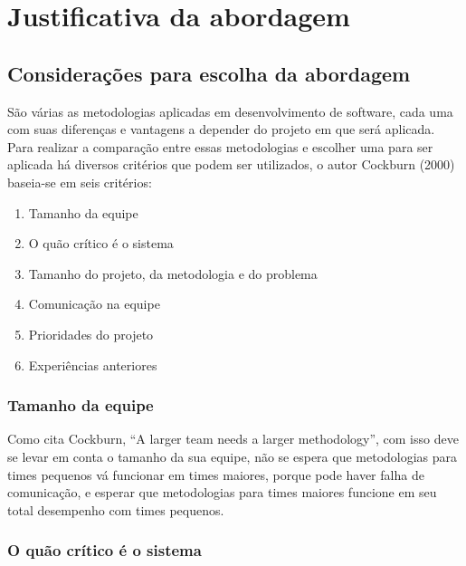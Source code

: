 \chapter{Justificativa da abordagem}

\section{Considerações para escolha da abordagem}

São várias as metodologias aplicadas em desenvolvimento de software, cada uma com suas diferenças e vantagens a depender do projeto em que será aplicada.
Para realizar a comparação entre essas metodologias e escolher uma para ser aplicada há diversos critérios que podem ser utilizados, o autor Cockburn (2000) baseia-se em seis critérios: 
\begin{enumerate}       
\item Tamanho da equipe
\item O quão crítico é o sistema
\item Tamanho do projeto, da metodologia e do problema
\item Comunicação na equipe
\item Prioridades do projeto
\item Experiências anteriores
\end{enumerate}
    
\subsection{Tamanho da equipe}

    Como cita Cockburn, “A larger team needs a larger methodology”, com isso deve se levar em conta o tamanho da sua equipe, não se espera que metodologias para times pequenos vá funcionar em times maiores, porque pode haver falha de comunicação, e esperar que metodologias para times maiores funcione em seu total desempenho com times pequenos.

\subsection{O quão crítico é o sistema}

